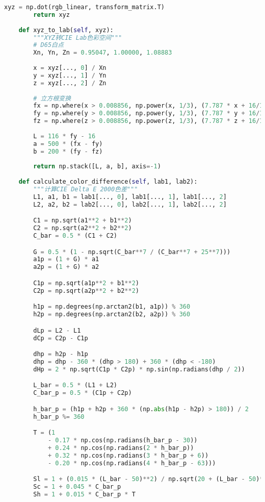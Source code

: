 \begin{lstlisting}[language=Python]
        xyz = np.dot(rgb_linear, transform_matrix.T)
        return xyz
    
    def xyz_to_lab(self, xyz):
        """XYZ转CIE Lab色彩空间"""
        # D65白点
        Xn, Yn, Zn = 0.95047, 1.00000, 1.08883
        
        x = xyz[..., 0] / Xn
        y = xyz[..., 1] / Yn
        z = xyz[..., 2] / Zn
        
        # 立方根变换
        fx = np.where(x > 0.008856, np.power(x, 1/3), (7.787 * x + 16/116))
        fy = np.where(y > 0.008856, np.power(y, 1/3), (7.787 * y + 16/116))
        fz = np.where(z > 0.008856, np.power(z, 1/3), (7.787 * z + 16/116))
        
        L = 116 * fy - 16
        a = 500 * (fx - fy)
        b = 200 * (fy - fz)
        
        return np.stack([L, a, b], axis=-1)
    
    def calculate_color_difference(self, lab1, lab2):
        """计算CIE Delta E 2000色差"""
        L1, a1, b1 = lab1[..., 0], lab1[..., 1], lab1[..., 2]
        L2, a2, b2 = lab2[..., 0], lab2[..., 1], lab2[..., 2]

        C1 = np.sqrt(a1**2 + b1**2)
        C2 = np.sqrt(a2**2 + b2**2)
        C_bar = 0.5 * (C1 + C2)

        G = 0.5 * (1 - np.sqrt(C_bar**7 / (C_bar**7 + 25**7)))
        a1p = (1 + G) * a1
        a2p = (1 + G) * a2

        C1p = np.sqrt(a1p**2 + b1**2)
        C2p = np.sqrt(a2p**2 + b2**2)

        h1p = np.degrees(np.arctan2(b1, a1p)) % 360
        h2p = np.degrees(np.arctan2(b2, a2p)) % 360

        dLp = L2 - L1
        dCp = C2p - C1p

        dhp = h2p - h1p
        dhp = dhp - 360 * (dhp > 180) + 360 * (dhp < -180)
        dHp = 2 * np.sqrt(C1p * C2p) * np.sin(np.radians(dhp / 2))

        L_bar = 0.5 * (L1 + L2)
        C_bar_p = 0.5 * (C1p + C2p)

        h_bar_p = (h1p + h2p + 360 * (np.abs(h1p - h2p) > 180)) / 2
        h_bar_p %= 360

        T = (1
            - 0.17 * np.cos(np.radians(h_bar_p - 30))
            + 0.24 * np.cos(np.radians(2 * h_bar_p))
            + 0.32 * np.cos(np.radians(3 * h_bar_p + 6))
            - 0.20 * np.cos(np.radians(4 * h_bar_p - 63)))

        Sl = 1 + (0.015 * (L_bar - 50)**2) / np.sqrt(20 + (L_bar - 50)**2)
        Sc = 1 + 0.045 * C_bar_p
        Sh = 1 + 0.015 * C_bar_p * T


\end{lstlisting}
